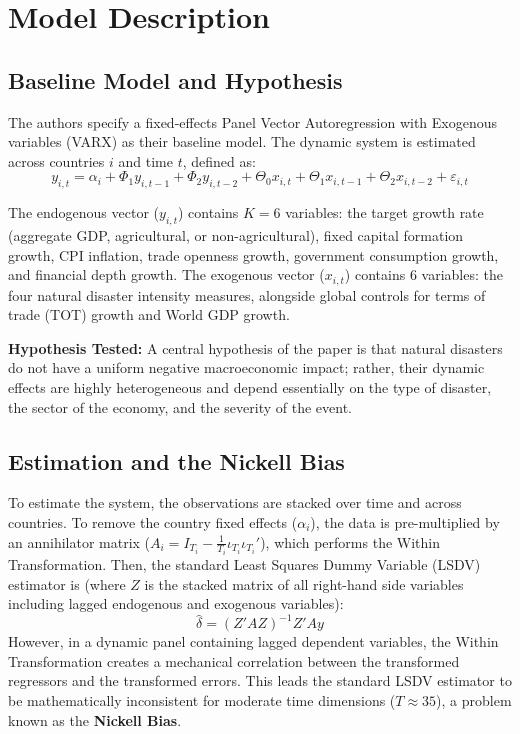 \documentclass[11pt, a4paper]{article}
\begin{document}
\section{Model Description}

\subsection{Baseline Model and Hypothesis}
The authors specify a fixed-effects Panel Vector Autoregression with Exogenous variables (VARX) as their baseline model. The dynamic system is estimated across countries $i$ and time $t$, defined as:
\begin{equation}
    y_{i,t} = \alpha_i + \Phi_1 y_{i,t-1} + \Phi_2 y_{i,t-2} + \Theta_0 x_{i,t} + \Theta_1 x_{i,t-1} + \Theta_2 x_{i,t-2} + \varepsilon_{i,t}
\end{equation}

The endogenous vector ($y_{i,t}$) contains $K=6$ variables: the target growth rate (aggregate GDP, agricultural, or non-agricultural), fixed capital formation growth, CPI inflation, trade openness growth, government consumption growth, and financial depth growth. The exogenous vector ($x_{i,t}$) contains 6 variables: the four natural disaster intensity measures, alongside global controls for terms of trade (TOT) growth and World GDP growth. 

\textbf{Hypothesis Tested:} A central hypothesis of the paper is that natural disasters do not have a uniform negative macroeconomic impact; rather, their dynamic effects are highly heterogeneous and depend essentially on the type of disaster, the sector of the economy, and the severity of the event.

\subsection{Estimation and the Nickell Bias}
To estimate the system, the observations are stacked over time and across countries. To remove the country fixed effects ($\alpha_i$), the data is pre-multiplied by an annihilator matrix ($A_i = I_{T_i} - \frac{1}{T_i} \iota_{T_i} \iota_{T_i}'$), which performs the Within Transformation. Then, the standard Least Squares Dummy Variable (LSDV) estimator is (where $Z$ is the stacked matrix of all right-hand side variables including lagged endogenous and exogenous variables):
\begin{equation}
    \hat{\delta} = (Z'AZ)^{-1}Z'Ay
\end{equation}
However, in a dynamic panel containing lagged dependent variables, the Within Transformation creates a mechanical correlation between the transformed regressors and the transformed errors. This leads the standard LSDV estimator to be mathematically inconsistent for moderate time dimensions ($T \approx 35$), a problem known as the \textbf{Nickell Bias}.
\end{document}
